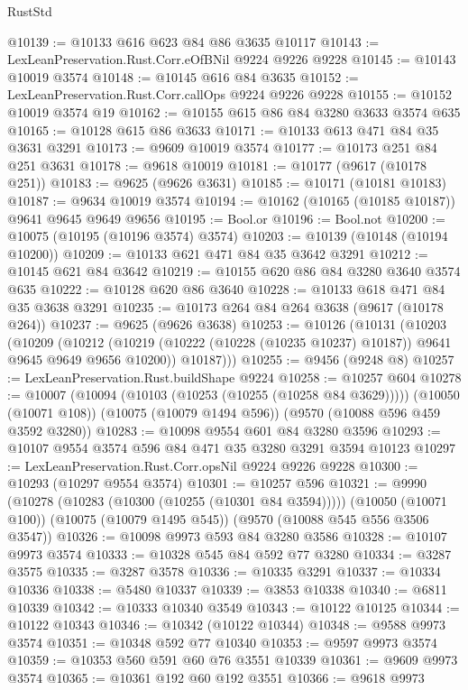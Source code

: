 \begin{lexlean}{RustStd}
\begin{coremodule}
{\begin{coremodule}
{{{{{{{{{{{{{{{{{{{{{{{{{{{{{{{{{@10139 := @10133 @616 @623 @84 @86 @3635 @10117
@10143 := LexLeanPreservation.Rust.Corr.eOfBNil @9224 @9226 @9228
@10145 := @10143 @10019 @3574
@10148 := @10145 @616 @84 @3635
@10152 := LexLeanPreservation.Rust.Corr.callOps @9224 @9226 @9228
@10155 := @10152 @10019 @3574 @19
@10162 := @10155 @615 @86 @84 @3280 @3633 @3574 @635
@10165 := @10128 @615 @86 @3633
@10171 := @10133 @613 @471 @84 @35 @3631 @3291
@10173 := @9609 @10019 @3574
@10177 := @10173 @251 @84 @251 @3631
@10178 := @9618 @10019
@10181 := @10177 (@9617 (@10178 @251))
@10183 := @9625 (@9626 @3631)
@10185 := @10171 (@10181 @10183)
@10187 := @9634 @10019 @3574
@10194 := @10162 (@10165 (@10185 @10187)) @9641 @9645 @9649 @9656
@10195 := Bool.or
@10196 := Bool.not
@10200 := @10075 (@10195 (@10196 @3574) @3574)
@10203 := @10139 (@10148 (@10194 @10200))
@10209 := @10133 @621 @471 @84 @35 @3642 @3291
@10212 := @10145 @621 @84 @3642
@10219 := @10155 @620 @86 @84 @3280 @3640 @3574 @635
@10222 := @10128 @620 @86 @3640
@10228 := @10133 @618 @471 @84 @35 @3638 @3291
@10235 := @10173 @264 @84 @264 @3638 (@9617 (@10178 @264))
@10237 := @9625 (@9626 @3638)
@10253 := @10126
    (@10131
      (@10203
        (@10209
          (@10212 (@10219 (@10222 (@10228 (@10235 @10237) @10187)) @9641 @9645 @9649 @9656 @10200))
          @10187)))
@10255 := @9456 (@9248 @8)
@10257 := LexLeanPreservation.Rust.buildShape @9224
@10258 := @10257 @604
@10278 := @10007
    (@10094 (@10103 (@10253 (@10255 (@10258 @84 @3629)))))
    (@10050 (@10071 @108))
    (@10075 (@10079 @1494 @596))
    (@9570 (@10088 @596 @459 @3592 @3280))
@10283 := @10098 @9554 @601 @84 @3280 @3596
@10293 := @10107 @9554 @3574 @596 @84 @471 @35 @3280 @3291 @3594 @10123
@10297 := LexLeanPreservation.Rust.Corr.opsNil @9224 @9226 @9228
@10300 := @10293 (@10297 @9554 @3574)
@10301 := @10257 @596
@10321 := @9990
    (@10278 (@10283 (@10300 (@10255 (@10301 @84 @3594)))))
    (@10050 (@10071 @100))
    (@10075 (@10079 @1495 @545))
    (@9570 (@10088 @545 @556 @3506 @3547))
@10326 := @10098 @9973 @593 @84 @3280 @3586
@10328 := @10107 @9973 @3574
@10333 := @10328 @545 @84 @592 @77 @3280
@10334 := @3287 @3575
@10335 := @3287 @3578
@10336 := @10335 @3291
@10337 := @10334 @10336
@10338 := @5480 @10337
@10339 := @3853 @10338
@10340 := @6811 @10339
@10342 := @10333 @10340 @3549
@10343 := @10122 @10125
@10344 := @10122 @10343
@10346 := @10342 (@10122 @10344)
@10348 := @9588 @9973 @3574
@10351 := @10348 @592 @77 @10340
@10353 := @9597 @9973 @3574
@10359 := @10353 @560 @591 @60 @76 @3551 @10339
@10361 := @9609 @9973 @3574
@10365 := @10361 @192 @60 @192 @3551
@10366 := @9618 @9973
}}}}}}}}}}}}}}}}}}}}}}}}}}}}}}}}}
\end{coremodule}}
\end{coremodule}
\end{lexlean}
